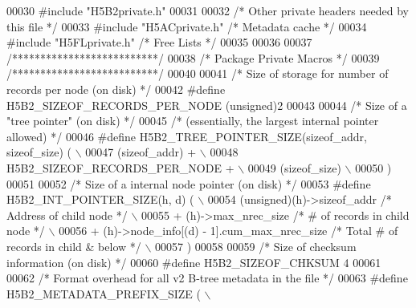 \begin{DoxyCode}
00030 \textcolor{preprocessor}{#include "H5B2private.h"}
00031 
00032 \textcolor{comment}{/* Other private headers needed by this file */}
00033 \textcolor{preprocessor}{#include "H5ACprivate.h"}    \textcolor{comment}{/* Metadata cache           */}
00034 \textcolor{preprocessor}{#include "H5FLprivate.h"}    \textcolor{comment}{/* Free Lists                           */}
00035 
00036 
00037 \textcolor{comment}{/**************************/}
00038 \textcolor{comment}{/* Package Private Macros */}
00039 \textcolor{comment}{/**************************/}
00040 
00041 \textcolor{comment}{/* Size of storage for number of records per node (on disk) */}
00042 \textcolor{preprocessor}{#define H5B2\_SIZEOF\_RECORDS\_PER\_NODE    (unsigned)2}
00043 
00044 \textcolor{comment}{/* Size of a "tree pointer" (on disk) */}
00045 \textcolor{comment}{/* (essentially, the largest internal pointer allowed) */}
00046 \textcolor{preprocessor}{#define H5B2\_TREE\_POINTER\_SIZE(sizeof\_addr, sizeof\_size)       (              \(\backslash\)}
00047 \textcolor{preprocessor}{    (sizeof\_addr) +                                                           \(\backslash\)}
00048 \textcolor{preprocessor}{    H5B2\_SIZEOF\_RECORDS\_PER\_NODE +                                            \(\backslash\)}
00049 \textcolor{preprocessor}{    (sizeof\_size)                                                             \(\backslash\)}
00050 \textcolor{preprocessor}{    )}
00051 
00052 \textcolor{comment}{/* Size of a internal node pointer (on disk) */}
00053 \textcolor{preprocessor}{#define H5B2\_INT\_POINTER\_SIZE(h, d) (                                         \(\backslash\)}
00054 \textcolor{preprocessor}{    (unsigned)(h)->sizeof\_addr  }\textcolor{comment}{/* Address of child node */}\textcolor{preprocessor}{                   \(\backslash\)}
00055 \textcolor{preprocessor}{    + (h)->max\_nrec\_size        }\textcolor{comment}{/* # of records in child node */}\textcolor{preprocessor}{              \(\backslash\)}
00056 \textcolor{preprocessor}{    + (h)->node\_info[(d) - 1].cum\_max\_nrec\_size }\textcolor{comment}{/* Total # of records in child & below */}\textcolor{preprocessor}{ \(\backslash\)}
00057 \textcolor{preprocessor}{    )}
00058 
00059 \textcolor{comment}{/* Size of checksum information (on disk) */}
00060 \textcolor{preprocessor}{#define H5B2\_SIZEOF\_CHKSUM      4}
00061 
00062 \textcolor{comment}{/* Format overhead for all v2 B-tree metadata in the file */}
00063 \textcolor{preprocessor}{#define H5B2\_METADATA\_PREFIX\_SIZE (                                           \(\backslash\)}

\end{DoxyCode}
